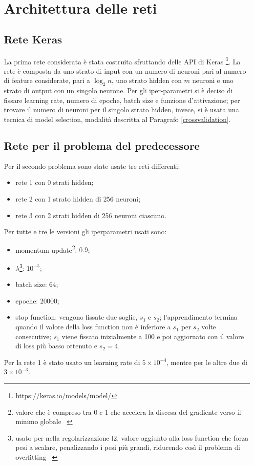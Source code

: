 \documentclass[12pt]{report}
\begin{document}
\section{Architettura delle reti}\label{architettura}
\subsection{Rete Keras}
La prima rete considerata è stata costruita sfruttando delle API di Keras \footnote{https://keras.io/models/model/}. La rete è composta da uno strato di input con un numero di neuroni pari al numero di feature considerate, pari a $\log_2 n$, uno strato hidden con $m$ neuroni e uno strato di output con un singolo neurone. Per gli iper-parametri si è deciso di fissare learning rate, numero di epoche, batch size e funzione d'attivazione; per trovare il numero di neuroni per il singolo strato hidden, invece, si è usata una tecnica di model selection, modalità descritta al Paragrafo \ref{crossvalidation}.

\subsection{Rete per il problema del predecessore}\label{reteAdHoc}
Per il secondo problema sono state usate tre reti differenti:
\begin{itemize}
\item{rete 1 con 0 strati hidden};
\item{rete 2 con 1 strato hidden di 256 neuroni};
\item{rete 3 con 2 strati hidden di 256 neuroni ciascuno}.
\end{itemize}

Per tutte e tre le versioni gli iperparametri usati sono:
\begin{itemize}
\item{momentum update}\footnote{valore che è compreso tra 0 e 1 che accelera la discesa del gradiente verso il minimo globale ~\cite{Momentum}}: $0.9$;
\item{$\lambda$}\footnote{usato per nella regolarizzazione l2, valore aggiunto alla loss function che forza pesi a scalare, penalizzando i pesi più grandi, riducendo così il problema di overfitting ~\cite{L2}}: $10^{-5}$;
\item{batch size}: $64$;
\item{epoche}: $20000$;
\item{stop function}: vengono fissate due soglie, $s_1$ e $s_2$; l'apprendimento termina quando il valore della loss function non è inferiore a $s_1$ per $s_2$ volte consecutive; $s_1$ viene fissato inizialmente a 100 e poi aggiornato con il valore di loss più basso ottenuto e $s_2 = 4$.
\end{itemize}
Per la rete 1 è stato usato un learning rate di $5 \times 10^{-4}$, mentre per le altre due di $3 \times 10^{-3}$.
\end{document}
